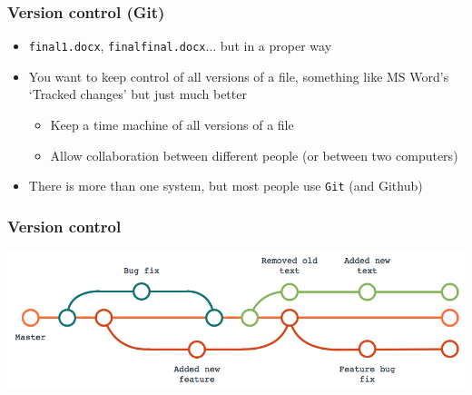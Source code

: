 \documentclass[aspectratio=43]{beamer}
\begin{document}
\begin{frame}
\frametitle{Version control (Git)}
\centering

\begin{itemize}[<+->]
  \item \texttt{final1.docx}, \texttt{finalfinal.docx}... but in a proper way
  \item You want to keep control of all versions of a file, something like MS Word's `Tracked changes' but just much better
  \begin{itemize}
    \item Keep a time machine of all versions of a file
    \item Allow collaboration between different people (or between two computers)
  \end{itemize}
  \item There is more than one system, but most people use \texttt{Git} (and Github)
\end{itemize}

\end{frame}

\begin{frame}
\frametitle{Version control}
\centering

\includegraphics[width = \textwidth]{img/gitesquema}

\end{frame}
\end{document}
